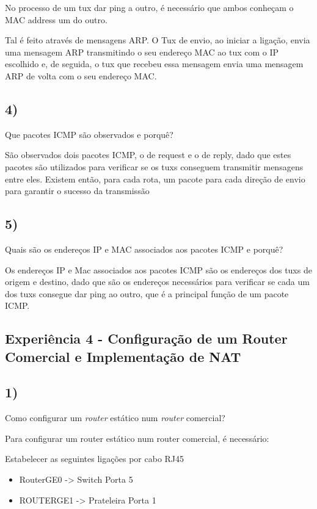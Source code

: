 \documentclass[11pt]{article}
\begin{document}
No processo de um tux dar ping a outro, é necessário que ambos conheçam o MAC address um do outro.

Tal é feito através de mensagens ARP. O Tux de envio, ao iniciar a ligação, envia uma mensagem ARP transmitindo o seu endereço MAC ao tux com o IP escolhido e, de seguida, o tux que recebeu essa mensagem envia uma mensagem ARP de volta com o seu endereço MAC.

\subsection{4)} Que pacotes ICMP são observados e porquê?

São observados dois pacotes ICMP, o de request e o de reply, dado que estes pacotes são utilizados para verificar se os tuxs conseguem transmitir mensagens entre eles. Existem então, para cada rota, um pacote para cada direção de envio para garantir o sucesso da transmissão

\subsection{5)} Quais são os endereços IP e MAC associados aos pacotes ICMP e porquê?

Os endereços IP e Mac associados aos pacotes ICMP são os endereços dos tuxs de origem e destino, dado que são os endereços necessários para verificar se cada um dos tuxs consegue dar ping ao outro, que é a principal função de um pacote ICMP. 

\subsection{Experiência 4 - Configuração de um Router Comercial e Implementação de NAT}

\subsection{1)} Como configurar um \emph{router} estático num \emph{router} comercial?

Para configurar um router estático num router comercial, é necessário:

Estabelecer as seguintes ligações por cabo RJ45
\begin{itemize}
\item RouterGE0 -> Switch Porta 5
\item ROUTERGE1  -> Prateleira Porta 1  
\end{itemize}
\end{document}
